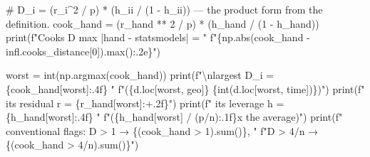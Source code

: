 \documentclass[
  letterpaper,
  10pt,
  twoside,
  openright,
  numbers=noenddot,
  chapterprefix=true]{scrbook}
\newenvironment{Shaded}{}{}
\newcommand{\BuiltInTok}[1]{\textcolor[rgb]{0.84,0.23,0.29}{#1}}
\newcommand{\CharTok}[1]{\textcolor[rgb]{0.01,0.18,0.38}{#1}}
\newcommand{\CommentTok}[1]{\textcolor[rgb]{0.42,0.45,0.49}{#1}}
\newcommand{\DecValTok}[1]{\textcolor[rgb]{0.00,0.36,0.77}{#1}}
\newcommand{\NormalTok}[1]{\textcolor[rgb]{0.14,0.16,0.18}{#1}}
\newcommand{\OperatorTok}[1]{\textcolor[rgb]{0.14,0.16,0.18}{#1}}
\newcommand{\SpecialCharTok}[1]{\textcolor[rgb]{0.00,0.36,0.77}{#1}}
\newcommand{\SpecialStringTok}[1]{\textcolor[rgb]{0.01,0.18,0.38}{#1}}
\newcommand{\StringTok}[1]{\textcolor[rgb]{0.01,0.18,0.38}{#1}}
\begin{document}
\label{check-cook}
\begin{Shaded}
\begin{Highlighting}[]
\CommentTok{\# D\_i = (r\_i\^{}2 / p) * (h\_ii / (1 {-} h\_ii)) — the product form from the definition.}
\NormalTok{cook\_hand }\OperatorTok{=}\NormalTok{ (r\_hand }\OperatorTok{**} \DecValTok{2} \OperatorTok{/}\NormalTok{ p) }\OperatorTok{*}\NormalTok{ (h\_hand }\OperatorTok{/}\NormalTok{ (}\DecValTok{1} \OperatorTok{{-}}\NormalTok{ h\_hand))}
\BuiltInTok{print}\NormalTok{(}\SpecialStringTok{f"Cook\textquotesingle{}s D    max |hand {-} statsmodels| = "}
      \SpecialStringTok{f"}\SpecialCharTok{\{}\NormalTok{np}\SpecialCharTok{.}\BuiltInTok{abs}\NormalTok{(cook\_hand }\OperatorTok{{-}}\NormalTok{ infl.cooks\_distance[}\DecValTok{0}\NormalTok{])}\SpecialCharTok{.}\BuiltInTok{max}\NormalTok{()}\SpecialCharTok{:.2e\}}\SpecialStringTok{"}\NormalTok{)}

\NormalTok{worst }\OperatorTok{=} \BuiltInTok{int}\NormalTok{(np.argmax(cook\_hand))}
\BuiltInTok{print}\NormalTok{(}\SpecialStringTok{f"}\CharTok{\textbackslash{}n}\SpecialStringTok{largest D\_i = }\SpecialCharTok{\{}\NormalTok{cook\_hand[worst]}\SpecialCharTok{:.4f\}}\SpecialStringTok{  "}
      \SpecialStringTok{f"(}\SpecialCharTok{\{}\NormalTok{d}\SpecialCharTok{.}\NormalTok{loc[worst, }\StringTok{\textquotesingle{}geo\textquotesingle{}}\NormalTok{]}\SpecialCharTok{\}}\SpecialStringTok{ }\SpecialCharTok{\{}\BuiltInTok{int}\NormalTok{(d.loc[worst, }\StringTok{\textquotesingle{}time\textquotesingle{}}\NormalTok{])}\SpecialCharTok{\}}\SpecialStringTok{)"}\NormalTok{)}
\BuiltInTok{print}\NormalTok{(}\SpecialStringTok{f"  its residual  r = }\SpecialCharTok{\{}\NormalTok{r\_hand[worst]}\SpecialCharTok{:+.2f\}}\SpecialStringTok{"}\NormalTok{)}
\BuiltInTok{print}\NormalTok{(}\SpecialStringTok{f"  its leverage  h = }\SpecialCharTok{\{}\NormalTok{h\_hand[worst]}\SpecialCharTok{:.4f\}}\SpecialStringTok{  "}
      \SpecialStringTok{f"(}\SpecialCharTok{\{}\NormalTok{h\_hand[worst] }\OperatorTok{/}\NormalTok{ (p}\OperatorTok{/}\NormalTok{n)}\SpecialCharTok{:.1f\}}\SpecialStringTok{x the average)"}\NormalTok{)}
\BuiltInTok{print}\NormalTok{(}\SpecialStringTok{f"  conventional flags: D \textgreater{} 1 → }\SpecialCharTok{\{}\NormalTok{(cook\_hand }\OperatorTok{\textgreater{}} \DecValTok{1}\NormalTok{)}\SpecialCharTok{.}\BuiltInTok{sum}\NormalTok{()}\SpecialCharTok{\}}\SpecialStringTok{, "}
      \SpecialStringTok{f"D \textgreater{} 4/n → }\SpecialCharTok{\{}\NormalTok{(cook\_hand }\OperatorTok{\textgreater{}} \DecValTok{4}\OperatorTok{/}\NormalTok{n)}\SpecialCharTok{.}\BuiltInTok{sum}\NormalTok{()}\SpecialCharTok{\}}\SpecialStringTok{"}\NormalTok{)}
\end{Highlighting}
\end{Shaded}
\end{document}
